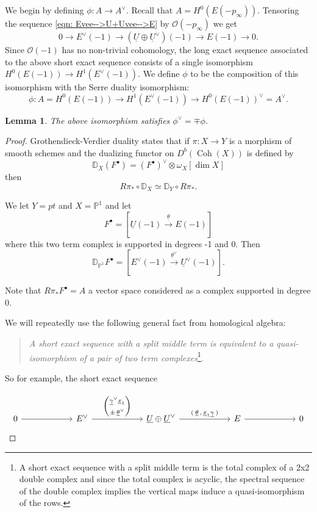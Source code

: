 \documentclass{amsart}
\newtheorem{lemma}[theorem]{Lemma}
\theoremstyle{definition}
\newcommand{\DD} {{\mathbb D}}
\newcommand{\PP}{\mathbb{P}}
\newcommand{\OO}{\mathcal{O}}
\newcommand{\UL}[1]{\underline{#1}}
\newcommand{\homotopyeq}{\simeq}
\newcommand{\Rpistar}{R\pi_{*}}
\begin{document}
We begin by defining $\phi :A\to A^{\vee}$. Recall that $A =
H^{0}(E(-p_{\infty}))$. Tensoring the sequence \eqref{eqn:
Evee-->U+Uvee-->E} by $\OO (-p_{\infty})$ we get
\[
0\to E^{\vee}(-1)\to (\UL{U}\oplus \UL{U}^{\vee})(-1)\to E(-1)\to 0.
\]
Since $\OO (-1)$ has no non-trivial cohomology, the long exact
sequence associated to the above short exact sequence consists of a
single isomorphism $H^{0}(E(-1))\to H^{1}(E^{\vee}(-1))$. We define
$\phi$ to be the composition of this isomorphism with the Serre
duality isomorphism: 
\[
\phi : A = H^{0}(E(-1))\to H^{1}(E^{\vee}(-1)) \to H^{0}(E(-1))^{\vee}=A^{\vee}.
\]

\begin{lemma}\label{lem: phivee = mp phi}
The above isomorphism satisfies $\phi^{\vee} = \mp \phi$. 
\end{lemma}
\begin{proof}
Grothendieck-Verdier duality \cite[Eq~3.20]{Huybrechts-FMbook} states
that if $\pi :X\to Y$ is a morphism of smooth schemes and the
dualizing functor on $D^{b}(\operatorname{Coh}(X))$ is defined by 
\[
\DD_{X}(F^{\bullet}) = (F^{\bullet})^{\vee} \otimes \omega_{X}[\dim X ]
\]
then
\[
\Rpistar \circ \DD_{X} \homotopyeq  \DD_{Y}\circ \Rpistar .
\]

We let $Y=pt$ and $X=\PP^{1}$ and let 
\[
F^{\bullet} = [\UL{U}(-1)\stackrel{\UL{\theta}}{\longrightarrow } E(-1)]
\]
where this two term complex is supported in degrees -1 and 0. Then
\[
\DD_{\PP^{1}}F^{\bullet} = [E^{\vee}(-1)\stackrel{\UL{\theta}^{\vee
}}{\longrightarrow } \UL{U}^{\vee}(-1)] .
\]

Note that $\Rpistar F^{\bullet}=A$ a vector space considered as a
complex supported in degree 0.

We will repeatedly use the following general fact from homological
algebra:
\bigskip

\begin{quote}
\emph{A short exact sequence with a split middle term is equivalent to
a quasi-isomorphism of a pair of two term complexes}\footnote{A short
exact sequence with a split middle term is the total complex of a 2x2
double complex and since the total complex is acyclic, the spectral
sequence of the double complex implies the vertical maps induce a
quasi-isomorphism of the rows.}.
\end{quote}
\bigskip

So for example, the short exact sequence

\[
\begin{tikzcd}[column sep=6em]
0 \arrow[r]
& E^{\vee}
  \arrow[r,"{%
    \begin{pmatrix}
      \UL{\gamma}^{\vee}\UL{x}_{1} \\[2pt]
      \pm\,\UL{\theta}^{\vee}
    \end{pmatrix}
  }"]
& \UL{U}\oplus \UL{U}^{\vee}
  \arrow[r,"{(\:\UL{\theta}\,,\,\UL{x}_{1}\UL{\gamma}\:)}"]
& E \arrow[r]
& 0
\end{tikzcd}
\]


\end{proof}
\end{document}
